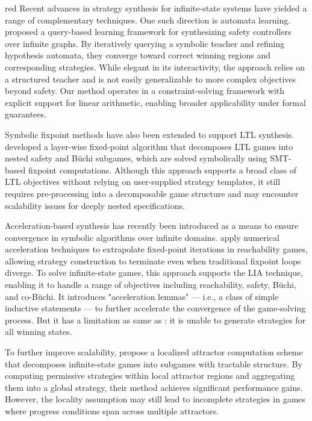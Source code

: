 \documentclass[review]{elsarticle}
\begin{document}
\begin{color}{red}
Recent advances in strategy synthesis for infinite-state systems have yielded a range of complementary techniques. One such direction is automata learning. 
\citet{NeiT2016} proposed a query-based learning framework for synthesizing safety controllers over infinite graphs. 
By iteratively querying a symbolic teacher and refining hypothesis automata, they converge toward correct winning regions and corresponding strategies. 
While elegant in its interactivity, the approach relies on a structured teacher and is not easily generalizable to more complex objectives beyond safety. 
Our method operates in a constraint-solving framework with explicit support for linear arithmetic, enabling broader applicability under formal guarantees.

Symbolic fixpoint methods have also been extended to support LTL synthesis. 
\citet{StaDK2021} developed a layer-wise fixed-point algorithm that decomposes LTL games into nested safety and Büchi subgames, which are solved symbolically using SMT-based fixpoint computations. 
Although this approach supports a broad class of LTL objectives without relying on user-supplied strategy templates, it still requires pre-processing into a decomposable game structure and may encounter scalability issues for deeply nested specifications.

Acceleration-based synthesis has recently been introduced as a means to ensure convergence in symbolic algorithms over infinite domains. 
\citet{HeiR2024} apply numerical acceleration techniques to extrapolate fixed-point iterations in reachability games, allowing strategy construction to terminate even when traditional fixpoint loops diverge. 
To solve infinite-state games, this approach supports the LIA technique, enabling it to handle a range of objectives including reachability, safety, Büchi, and co-Büchi. 
It introduces "acceleration lemmas" — i.e., a class of simple inductive statements — to further accelerate the convergence of the game-solving process. 
But it has a limitation as same as \citep{DanO2019}: it is unable to generate strategies for all winning states.

To further improve scalability, \citet{SchHDN2024} propose a localized attractor computation scheme that decomposes infinite-state games into subgames with tractable structure.
By computing permissive strategies within local attractor regions and aggregating them into a global strategy, their method achieves significant performance gains. 
However, the locality assumption may still lead to incomplete strategies in games where progress conditions span across multiple attractors. 


\end{color}
\end{document}
